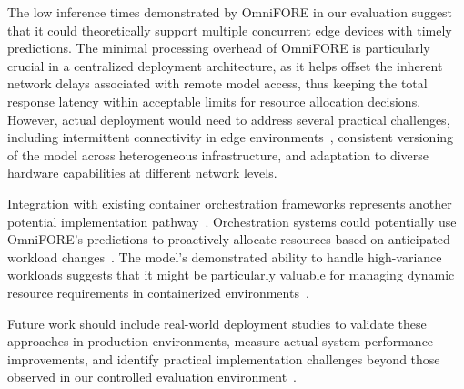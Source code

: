 The low inference times demonstrated by \ac{OmniFORE} in our evaluation suggest that it could theoretically support multiple concurrent edge devices with timely predictions. The minimal processing overhead of \ac{OmniFORE} is particularly crucial in a centralized deployment architecture, as it helps offset the inherent network delays associated with remote model access, thus keeping the total response latency within acceptable limits for resource allocation decisions. However, actual deployment would need to address several practical challenges, including intermittent connectivity in edge environments~\cite{10417087}, consistent versioning of the model across heterogeneous infrastructure, and adaptation to diverse hardware capabilities at different network levels.

Integration with existing container orchestration frameworks represents another potential implementation pathway~\cite{10052731}. Orchestration systems could potentially use \ac{OmniFORE}'s predictions to proactively allocate resources based on anticipated workload changes~\cite{10646623}. The model's demonstrated ability to handle high-variance workloads suggests that it might be particularly valuable for managing dynamic resource requirements in containerized environments~\cite{10417087, 10646623}.

Future work should include real-world deployment studies to validate these approaches in production environments, measure actual system performance improvements, and identify practical implementation challenges beyond those observed in our controlled evaluation environment~\cite{gort2024forecasting, 10417087}.

